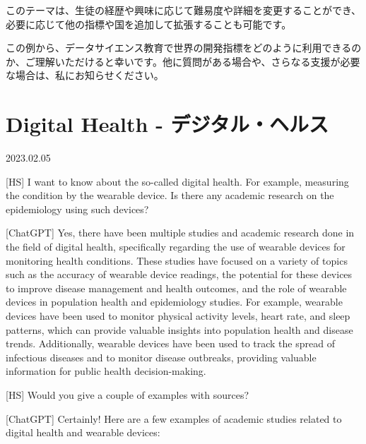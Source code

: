 \documentclass[
]{book}
\theoremstyle{definition}
\theoremstyle{definition}
\theoremstyle{definition}
\theoremstyle{definition}
\theoremstyle{remark}
\begin{document}
このテーマは、生徒の経歴や興味に応じて難易度や詳細を変更することができ、必要に応じて他の指標や国を追加して拡張することも可能です。

この例から、データサイエンス教育で世界の開発指標をどのように利用できるのか、ご理解いただけると幸いです。他に質問がある場合や、さらなる支援が必要な場合は、私にお知らせください。

\hypertarget{digitalhealth}{%
\section{Digital Health - デジタル・ヘルス　}\label{digitalhealth}}

2023.02.05

{[}HS{]} I want to know about the so-called digital health. For example, measuring the condition by the wearable device. Is there any academic research on the epidemiology using such devices?

{[}ChatGPT{]} Yes, there have been multiple studies and academic research done in the field of digital health, specifically regarding the use of wearable devices for monitoring health conditions. These studies have focused on a variety of topics such as the accuracy of wearable device readings, the potential for these devices to improve disease management and health outcomes, and the role of wearable devices in population health and epidemiology studies. For example, wearable devices have been used to monitor physical activity levels, heart rate, and sleep patterns, which can provide valuable insights into population health and disease trends. Additionally, wearable devices have been used to track the spread of infectious diseases and to monitor disease outbreaks, providing valuable information for public health decision-making.

{[}HS{]} Would you give a couple of examples with sources?

{[}ChatGPT{]} Certainly! Here are a few examples of academic studies related to digital health and wearable devices:
\end{document}
